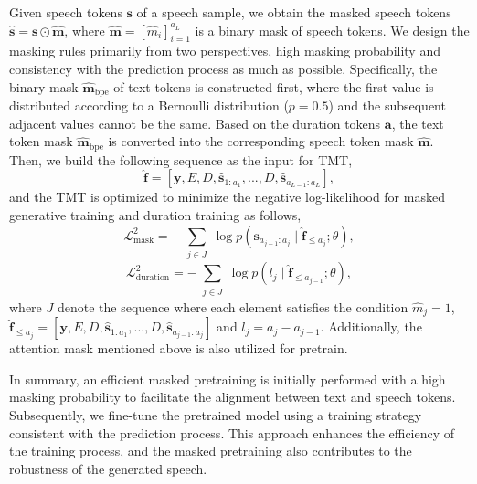 Given speech tokens $\boldsymbol{s}$ of a speech sample, we obtain the masked speech tokens $\boldsymbol{\hat{s}} = \boldsymbol{s} \odot \boldsymbol{\hat{m}} $, where $\boldsymbol{\hat{m}}=[\hat{m}_{i}]_{i=1}^{a_{L}} $ is a binary mask of speech tokens. 
We design the masking rules primarily from two perspectives, high masking probability and consistency with the prediction process as much as possible.
Specifically, the binary mask $\boldsymbol{\hat{m}}_\text{bpe}$ of text tokens is constructed first, where the first value is distributed according to a Bernoulli distribution ($p=0.5$) and the subsequent adjacent values cannot be the same. Based on the duration tokens $\boldsymbol{a}$, the text token mask $\boldsymbol{\hat{m}}_\text{bpe}$ is converted into the corresponding speech token mask $\boldsymbol{\hat{m}}$. Then, we build the following sequence as the input for TMT, 
\begin{equation}
\boldsymbol{\hat{f}} = [\boldsymbol{y},E, D, \boldsymbol{\hat{s}}_{1:a_1},..., D, \boldsymbol{\hat{s}}_{a_{L-1}:a_L}],
\end{equation}
and the TMT is optimized to minimize the negative log-likelihood for masked generative training and duration training as follows,
\begin{equation}
\mathcal{L}_{\text {mask}}^{2} =- \sum_{\substack{j \in J}} \log p \left(\boldsymbol{s}_{a_{j-1}:a_{j}} \mid \boldsymbol{\hat{f}}_{\leq a_{j}}; \theta \right),
\end{equation}
\begin{equation}
\mathcal{L}_{\text {duration}}^{2} =- \sum_{\substack{j \in J}} \log p \left(l_{j}\mid \boldsymbol{\hat{f}}_{\leq a_{j-1}}; \theta \right),
\end{equation}
where $J$ denote the sequence where each element satisfies the condition $\hat{m}_{j} = 1$,  
$\boldsymbol{\hat{f}}_{\leq a_{j}}=[\boldsymbol{y},E, D,\boldsymbol{\hat{s}}_{1:a_1},..., D, \boldsymbol{\hat{s}}_{a_{j-1}:a_j}]$ and $l_{j} = a_{j} - a_{j-1}$.  Additionally, the attention mask mentioned above is also utilized for pretrain.


In summary, an efficient masked pretraining is initially performed with a high masking probability to facilitate the alignment between text and speech tokens. Subsequently, we fine-tune the pretrained model using a training strategy consistent with the prediction process. This approach enhances the efficiency of the training process, and the masked pretraining also contributes to the robustness of the generated speech.


